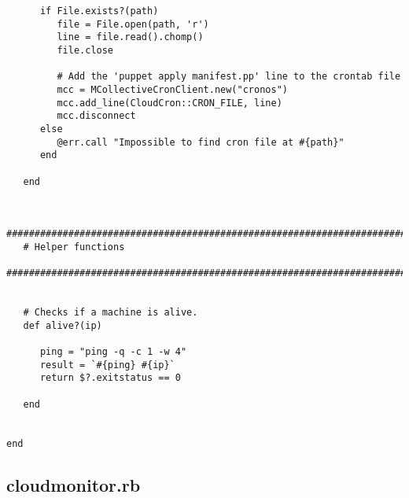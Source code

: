 \begin{lstlisting}
      if File.exists?(path)
         file = File.open(path, 'r')
         line = file.read().chomp()
         file.close
         
         # Add the 'puppet apply manifest.pp' line to the crontab file
         mcc = MCollectiveCronClient.new("cronos")
         mcc.add_line(CloudCron::CRON_FILE, line)
         mcc.disconnect
      else
         @err.call "Impossible to find cron file at #{path}"
      end
      
   end


   #############################################################################
   # Helper functions
   #############################################################################


   # Checks if a machine is alive.
   def alive?(ip)

      ping = "ping -q -c 1 -w 4"
      result = `#{ping} #{ip}`
      return $?.exitstatus == 0

   end


end
\end{lstlisting}


\subsection{cloudmonitor.rb}


